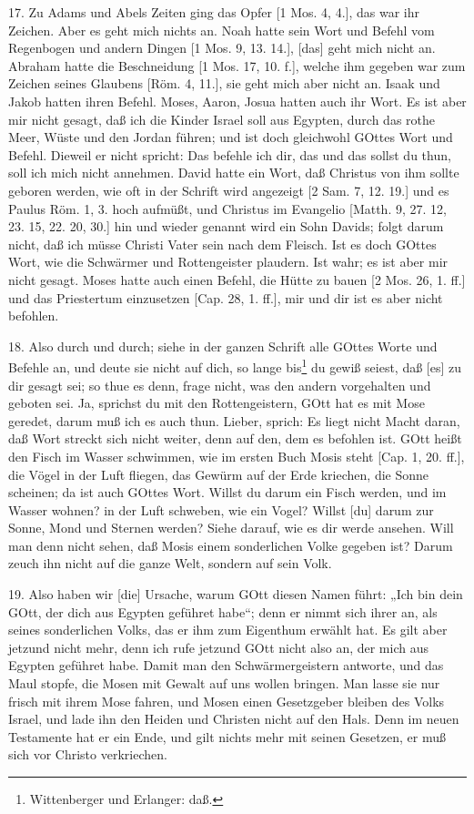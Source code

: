 17. Zu Adams und Abels Zeiten ging das Opfer [1 Mos. 4, 4.], das war ihr Zeichen. Aber es geht mich nichts an. Noah hatte sein Wort und Befehl vom Regenbogen und andern Dingen [1 Mos. 9, 13. 14.], [das] geht mich nicht an. Abraham hatte die Beschneidung [1 Mos. 17, 10. f.], welche ihm gegeben war zum Zeichen seines Glaubens [Röm. 4, 11.], sie geht mich aber nicht an. Isaak und Jakob hatten ihren Befehl. Moses, Aaron, Josua hatten auch ihr Wort. Es ist aber mir nicht gesagt, daß ich die Kinder Israel soll aus Egypten, durch das rothe Meer, Wüste und den Jordan führen; und ist doch gleichwohl GOttes Wort und Befehl. Dieweil er nicht spricht: Das befehle ich dir, das und das sollst du thun, soll ich mich nicht annehmen. David hatte ein Wort, daß Christus von ihm sollte geboren werden, wie oft in der Schrift wird angezeigt [2 Sam. 7, 12. 19.] und es Paulus Röm. 1, 3. hoch aufmüßt, und Christus im Evangelio [Matth. 9, 27. 12, 23. 15, 22. 20, 30.] hin und wieder genannt wird ein Sohn Davids; folgt darum nicht, daß ich müsse Christi Vater sein nach dem Fleisch. Ist es doch GOttes Wort, wie die Schwärmer und Rottengeister plaudern. Ist wahr; es ist aber mir nicht gesagt. Moses hatte auch einen Befehl, die Hütte zu bauen [2 Mos. 26, 1. ff.] und das Priestertum einzusetzen [Cap. 28, 1. ff.], mir und dir ist es aber nicht befohlen.

18. Also durch und durch; siehe in der ganzen Schrift alle GOttes Worte und Befehle an, und deute sie nicht auf dich, so lange bis\footnote{Wittenberger und Erlanger: daß.} du gewiß seiest, daß [es] zu dir gesagt sei; so thue es denn, frage nicht, was den andern vorgehalten und geboten sei. Ja, sprichst du mit den Rottengeistern, GOtt hat es mit Mose geredet, darum muß ich es auch thun. Lieber, sprich: Es liegt nicht Macht daran, daß Wort streckt sich nicht weiter, denn auf den, dem es befohlen ist. GOtt heißt
den Fisch im Wasser schwimmen, wie im ersten Buch Mosis steht [Cap. 1, 20. ff.], die Vögel in der Luft fliegen, das Gewürm auf der Erde kriechen, die Sonne scheinen; da ist auch GOttes Wort. Willst du darum ein Fisch werden, und im Wasser wohnen? in der Luft schweben, wie ein Vogel? Willst [du] darum zur Sonne, Mond und Sternen werden? Siehe darauf, wie es dir werde ansehen. Will man denn nicht sehen, daß Mosis einem sonderlichen Volke gegeben ist? Darum zeuch ihn nicht auf die ganze Welt, sondern auf sein Volk.

19. Also haben wir [die] Ursache, warum GOtt diesen Namen führt: „Ich bin dein GOtt, der dich aus Egypten geführet habe“; denn er nimmt sich ihrer an, als seines sonderlichen Volks, das er ihm zum Eigenthum erwählt hat. Es gilt aber jetzund nicht mehr, denn ich rufe jetzund GOtt nicht also an, der mich aus Egypten geführet habe. Damit man den Schwärmergeistern antworte, und das Maul stopfe, die Mosen mit Gewalt auf uns wollen bringen. Man lasse sie nur frisch mit ihrem Mose fahren, und Mosen einen Gesetzgeber bleiben des Volks Israel, und lade ihn den Heiden und Christen nicht auf den Hals. Denn im neuen Testamente hat er ein Ende, und gilt nichts mehr mit seinen Gesetzen, er muß sich vor Christo verkriechen.

